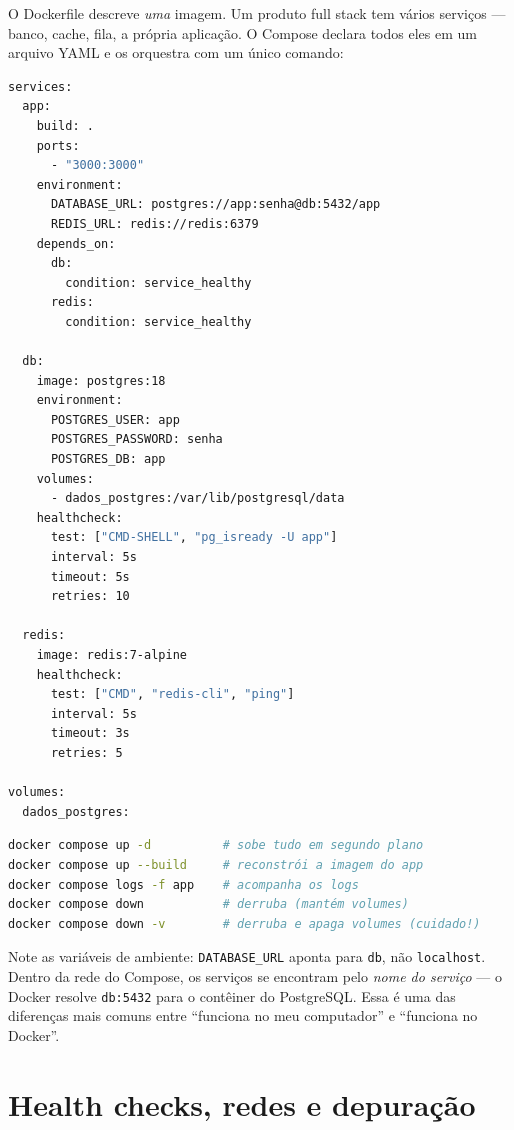 O Dockerfile descreve \emph{uma} imagem. Um produto full stack tem vários
serviços — banco, cache, fila, a própria aplicação. O Compose declara todos
eles em um arquivo YAML e os orquestra com um único comando:

\begin{lstlisting}[style=livro, language=Bash,
  caption={docker-compose.yml com app, banco e redis.}, label={list:docker-compose}]
services:
  app:
    build: .
    ports:
      - "3000:3000"
    environment:
      DATABASE_URL: postgres://app:senha@db:5432/app
      REDIS_URL: redis://redis:6379
    depends_on:
      db:
        condition: service_healthy
      redis:
        condition: service_healthy

  db:
    image: postgres:18
    environment:
      POSTGRES_USER: app
      POSTGRES_PASSWORD: senha
      POSTGRES_DB: app
    volumes:
      - dados_postgres:/var/lib/postgresql/data
    healthcheck:
      test: ["CMD-SHELL", "pg_isready -U app"]
      interval: 5s
      timeout: 5s
      retries: 10

  redis:
    image: redis:7-alpine
    healthcheck:
      test: ["CMD", "redis-cli", "ping"]
      interval: 5s
      timeout: 3s
      retries: 5

volumes:
  dados_postgres:
\end{lstlisting}

\begin{lstlisting}[style=livro, language=Bash,
  caption={Comandos essenciais do Compose.}, label={list:docker-comandos}]
docker compose up -d          # sobe tudo em segundo plano
docker compose up --build     # reconstrói a imagem do app
docker compose logs -f app    # acompanha os logs
docker compose down           # derruba (mantém volumes)
docker compose down -v        # derruba e apaga volumes (cuidado!)
\end{lstlisting}

\begin{caixadica}
Note as variáveis de ambiente: \texttt{DATABASE\_URL} aponta para
\texttt{db}, não \texttt{localhost}. Dentro da rede do Compose, os serviços
se encontram pelo \emph{nome do serviço} — o Docker resolve
\texttt{db:5432} para o contêiner do PostgreSQL. Essa é uma das diferenças
mais comuns entre ``funciona no meu computador'' e ``funciona no Docker''.
\end{caixadica}

\section{Health checks, redes e depuração}

